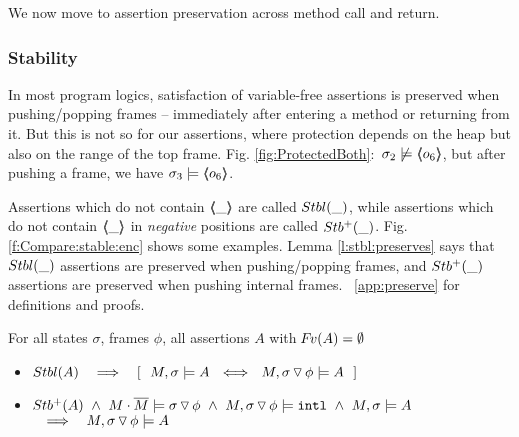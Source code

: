 \noindent
We now move to assertion preservation across method call and return.  

\subsubsection{\textbf{Stability}} %
\label{s:preserve:call:ret}
In most program logics, satisfaction of  variable-free assertions  is preserved when pushing/popping frames
-- \ie immediately after entering a method or  returning from it.
But this is not  so for our assertions, where protection depends %
on the heap but also 
on the range of %
the top frame. \Eg  Fig. \ref{fig:ProtectedBoth}:\  
$\sigma_2 \not\models \langle\!\!\langle o_6 \rangle\!\!\rangle$, but after pushing a frame, we have $\sigma_3  \models \langle\!\!\langle o_6 \rangle\!\!\rangle$.
 
 

{Assertions} which do  not contain  $\langle\!\!\langle \_ \rangle\!\!\rangle$   are called ${Stbl( \_ )}$, 
while assertions which do  not contain $\langle\!\!\langle \_ \rangle\!\!\rangle$ in \emph{negative} positions are called ${Stb^+( \_ )}$. 
Fig. \ref{f:Compare:stable:enc} shows some examples.
Lemma \ref{l:stbl:preserves} says that ${Stbl( \_ )}$ assertions are  preserved when pushing/popping frames,
and ${Stb^+( \_ )}$ assertions are preserved when pushing  {internal} frames.
\Cf    \A\ \ref{app:preserve} for   definitions and proofs. 

\begin{lemma}
For all  states $\sigma$, frames $\phi$,   all assertions $A$ with  ${\hspace{-1pt}F\hspace{-1pt}}v(A)=\emptyset $
\label{l:preserve:asrt}
\label{l:stbl:preserves} 
\begin{itemize}
\item 
$\Stable{A} \  \ \  \Longrightarrow  \  \ \  [\ \ M, \sigma \models A \ \ \Longleftrightarrow \ \  M,{\PushSLong \phi \sigma} \models A\ \ ]$
\item 
\label{l:preserve:asrt:two}
${Stb^+( A )}   \ \wedge    \ {M\cdot\overline{M} \models {\ensuremath{ \sigma \, {\triangledown}\, \phi}}}\  \wedge\  M, { \sigma \, {\triangledown}\, \phi} \models  \mbox{\normalfont{\texttt{intl}}}\  \wedge  \ M, \sigma \models A $
$\  \ \ \Longrightarrow \ \  \ M,{ \sigma \, {\triangledown}\, \phi} \models A\ $
\end{itemize}
\end{lemma}


